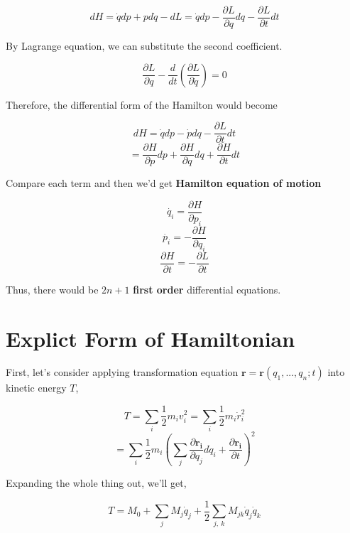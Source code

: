 \documentclass[12pt]{article}
\begin{document}
\begin{center}
    \[ dH = \dot{q}dp + pd\dot{q} - dL = \dot{q}dp - \frac{ \partial{L} }{ \partial{q} } dq - \frac{ \partial{L} }{ \partial{t} } dt \]
\end{center}

By Lagrange equation, we can substitute the second coefficient.

\begin{center}
    \[ \frac{\partial{L}}{\partial{q}} - \frac{d}{dt} \left( \frac{ \partial{L} }{ \partial{\dot{q}} }\right)= 0 \]
\end{center}

Therefore, the differential form of the Hamilton would become

\begin{center}
    \[ dH = \dot{q} dp - \dot{p} dq - \frac{\partial{L}}{\partial{t}} dt\]
    \[ = \frac{ \partial{H} }{ \partial{p} } dp + \frac{ \partial{H} }{ \partial{q} } dq + \frac{ \partial{H} }{ \partial{t} } dt\]
\end{center}

Compare each term and then we'd get \textbf{Hamilton equation of motion}

\begin{center}
    \[ \dot{q_i} = \frac{ \partial{H} }{ \partial{p_i} }\]
    \[ \dot{p_i} = -\frac{ \partial{H} }{ \partial{q_i} }\]
    \[ \frac{ \partial{H} }{ \partial{t} } = -\frac{ \partial{L} }{ \partial{t} }\]
\end{center}

Thus, there would be $2n+1$ \textbf{first order} differential equations.

\section{Explict Form of Hamiltonian}
First, let's consider applying transformation equation $\mathbf{r} = \mathbf{r}(q_1, ..., q_n; t)$ into kinetic energy $T$,

\begin{center}
    \[ T = \sum_i{\frac{1}{2}m_i v_{i}^2 = \sum_i{\frac{1}{2} m_i \dot{r}_{i}^2}} \]
    \[ = \sum_i{\frac{1}{2} m_i \left( \sum_j{ \frac{\partial \mathbf{r_i}}{\partial q_j}d\dot{q}_i + \frac{\partial \mathbf{r_i}}{\partial t} }\right)^2} \]
\end{center}

Expanding the whole thing out, we'll get,

\begin{center}
    \[ T = M_0 + \sum_{j}{M_j\dot{q}_j} + \frac{1}{2}\sum_{j,\ k}{M_{jk}\dot{q}_j\dot{q}_k} \]
\end{center}
\end{document}
